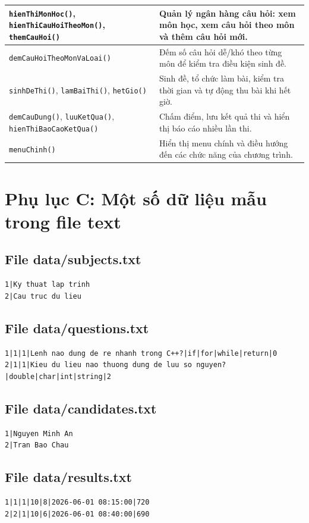 \documentclass[12pt,a4paper]{report}
\newcommand{\codecell}[1]{\texttt{#1}}
\begin{document}
\begin{longtable}{|>{\Centering\arraybackslash}p{}|>{\Centering\arraybackslash}p{}|}
\hline
\codecell{hienThiMonHoc()}, \codecell{hienThiCauHoiTheoMon()}, \codecell{themCauHoi()} & Quản lý ngân hàng câu hỏi: xem môn học, xem câu hỏi theo môn và thêm câu hỏi mới. \\
\hline
\codecell{demCauHoiTheoMonVaLoai()} & Đếm số câu hỏi dễ/khó theo từng môn để kiểm tra điều kiện sinh đề. \\
\hline
\codecell{sinhDeThi()}, \codecell{lamBaiThi()}, \codecell{hetGio()} & Sinh đề, tổ chức làm bài, kiểm tra thời gian và tự động thu bài khi hết giờ. \\
\hline
\codecell{demCauDung()}, \codecell{luuKetQua()}, \codecell{hienThiBaoCaoKetQua()} & Chấm điểm, lưu kết quả thi và hiển thị báo cáo nhiều lần thi. \\
\hline
\codecell{menuChinh()} & Hiển thị menu chính và điều hướng đến các chức năng của chương trình. \\
\hline
\end{longtable}

\section{Phụ lục C: Một số dữ liệu mẫu trong file text}

\subsection{File data/subjects.txt}

\begin{lstlisting}[caption={Dữ liệu mẫu file data/subjects.txt}]
1|Ky thuat lap trinh
2|Cau truc du lieu
\end{lstlisting}

\subsection{File data/questions.txt}

\begin{lstlisting}[caption={Dữ liệu mẫu file data/questions.txt}]
1|1|1|Lenh nao dung de re nhanh trong C++?|if|for|while|return|0
2|1|1|Kieu du lieu nao thuong dung de luu so nguyen?|double|char|int|string|2
\end{lstlisting}

\subsection{File data/candidates.txt}

\begin{lstlisting}[caption={Dữ liệu mẫu file data/candidates.txt}]
1|Nguyen Minh An
2|Tran Bao Chau
\end{lstlisting}

\subsection{File data/results.txt}

\begin{lstlisting}[caption={Dữ liệu mẫu file data/results.txt}]
1|1|1|10|8|2026-06-01 08:15:00|720
2|2|1|10|6|2026-06-01 08:40:00|690
\end{lstlisting}
\end{document}
